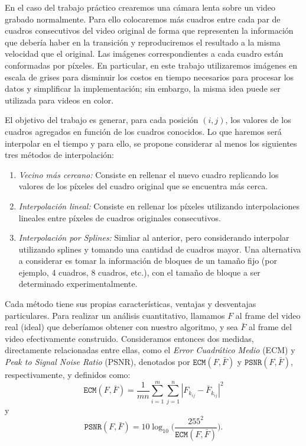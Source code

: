     En el caso del trabajo práctico crearemos una cámara lenta sobre un video grabado normalmente. Para ello colocaremos más cuadros entre cada par de cuadros consecutivos del video original de forma que representen la información que debería haber en la transición y reproduciremos el resultado a la misma velocidad que el original. Las im\'agenes correspondientes a cada cuadro est\'an conformadas por p\'ixeles. En particular, en este trabajo utilizaremos im\'agenes en escala de grises para disminuir los costos en tiempo necesarios para procesar los datos y simplificar la implementaci\'on; sin embargo, la misma idea puede ser utilizada para videos en color. 

    El objetivo del trabajo es generar, para cada posici\'on $(i,j)$, los valores de los cuadros agregados en funci\'on de los cuadros conocidos. Lo que haremos ser\'a interpolar en el tiempo y para ello, se propone considerar al menos los siguientes tres m\'etodos de interpolaci\'on:

    \begin{enumerate}
    \item \emph{Vecino m\'as cercano:} Consiste en rellenar el nuevo cuadro replicando los valores de los p\'ixeles del cuadro original que se encuentra más cerca. \label{item:nn}
    \item \emph{Interpolaci\'on lineal:} Consiste en rellenar los p\'ixeles utilizando interpolaciones lineales entre p\'ixeles de cuadros originales consecutivos. \label{item:lineal}
    \item \emph{Interpolaci\'on por Splines:} Simliar al anterior, pero considerando interpolar utilizando splines y tomando una cantidad de cuadros mayor. Una alternativa a considerar es tomar la informaci\'on de bloques de un tama\~no fijo (por ejemplo, 4 cuadros, 8 cuadros, etc.), con el tama\~no de bloque a ser determinado experimentalmente. \label{item:spline}
    \end{enumerate}


    Cada m\'etodo tiene sus propias caracter\'isticas, ventajas y desventajas particulares. Para realizar un an\'alisis cuantitativo, llamamos $F$ al frame del video real (ideal) que deber\'iamos obtener con nuestro algoritmo, y sea $\bar{F}$ al frame del video efectivamente construido. Consideramos entonces dos medidas, directamente relacionadas entre ellas, como el \emph{Error Cuadr\'atico Medio} (ECM) y \emph{Peak to Signal Noise Ratio} (PSNR), denotados por $\texttt{ECM}(F,\bar{F})$ y $\texttt{PSNR}(F,\bar{F})$, respectivamente, y definidos como:
    \begin{equation}
    \texttt{ECM}(F,\bar{F}) = \frac{1}{mn}\sum_{i=1}^m\sum_{j = 1}^n |F_{k_{ij}} - \bar{F}_{k_{ij}}|^2 \label{eq:ecm}
    \end{equation}
    \noindent y
    \begin{equation}
    \texttt{PSNR}(F,\bar{F}) = 10 \log_{10}\bigg(\frac{255^2}{\texttt{ECM}(F,\bar{F})}\bigg). \label{eq:psnr}
    \end{equation}

